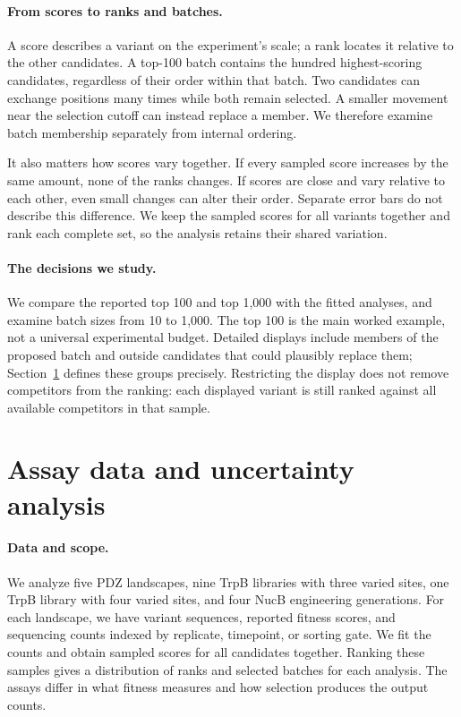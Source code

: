 \documentclass[11pt]{article}
\begin{document}
\paragraph{From scores to ranks and batches.}
A score describes a variant on the experiment's scale; a rank locates it
relative to the other candidates. A top-100 batch contains the hundred
highest-scoring candidates, regardless of their order within that batch.
Two candidates can exchange positions many times while both remain selected.
A smaller movement near the selection cutoff can instead replace a member.
We therefore examine batch membership separately from internal ordering.

It also matters how scores vary together. If every sampled score increases
by the same amount, none of the ranks changes. If scores are close and vary
relative to each other, even small changes can alter their order. Separate
error bars do not describe this difference. We keep the sampled scores for
all variants together and rank each complete set, so the analysis retains
their shared variation.

\paragraph{The decisions we study.}
We compare the reported top 100 and top 1,000 with the fitted analyses,
and examine batch sizes from 10 to 1,000. The top 100 is the main worked
example, not a universal experimental budget. Detailed displays include
members of the proposed batch and outside candidates that could plausibly
replace them; Section~\ref{sec:methods} defines these groups precisely.
Restricting the display does not remove competitors from the ranking:
each displayed variant is still ranked against all available competitors
in that sample.

\section{Assay data and uncertainty analysis}
\label{sec:methods}

\paragraph{Data and scope.}
We analyze five PDZ landscapes, nine TrpB libraries with three varied sites,
one TrpB library with four varied sites, and four NucB engineering generations.
For each landscape, we have variant sequences, reported fitness scores, and
sequencing counts indexed by replicate, timepoint, or sorting gate. We fit
the counts and obtain sampled scores for all candidates together. Ranking
these samples gives a distribution of ranks and selected batches for each
analysis. The assays differ in what fitness measures and how selection
produces the output counts.
\end{document}
